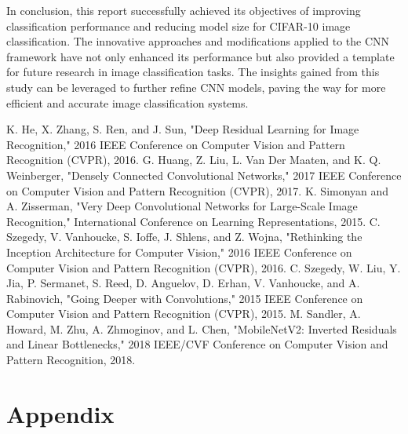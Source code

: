\documentclass[conference]{IEEEtran}
\begin{document}
	In conclusion, this report successfully achieved its objectives of improving classification performance and reducing model size for CIFAR-10 image classification. The innovative approaches and modifications applied to the CNN framework have not only enhanced its performance but also provided a template for future research in image classification tasks. The insights gained from this study can be leveraged to further refine CNN models, paving the way for more efficient and accurate image classification systems.
	
	\begin{thebibliography}{00}
		 K. He, X. Zhang, S. Ren, and J. Sun, "Deep Residual Learning for Image Recognition," 2016 IEEE Conference on Computer Vision and Pattern Recognition (CVPR), 2016.
		 G. Huang, Z. Liu, L. Van Der Maaten, and K. Q. Weinberger, "Densely Connected Convolutional Networks," 2017 IEEE Conference on Computer Vision and Pattern Recognition (CVPR), 2017.
		 K. Simonyan and A. Zisserman, "Very Deep Convolutional Networks for Large-Scale Image Recognition," International Conference on Learning Representations, 2015.
		 C. Szegedy, V. Vanhoucke, S. Ioffe, J. Shlens, and Z. Wojna, "Rethinking the Inception Architecture for Computer Vision," 2016 IEEE Conference on Computer Vision and Pattern Recognition (CVPR), 2016.
		 C. Szegedy, W. Liu, Y. Jia, P. Sermanet, S. Reed, D. Anguelov, D. Erhan, V. Vanhoucke, and A. Rabinovich, "Going Deeper with Convolutions," 2015 IEEE Conference on Computer Vision and Pattern Recognition (CVPR), 2015.
		 M. Sandler, A. Howard, M. Zhu, A. Zhmoginov, and L. Chen, "MobileNetV2: Inverted Residuals and Linear Bottlenecks," 2018 IEEE/CVF Conference on Computer Vision and Pattern Recognition, 2018.
	\end{thebibliography}
	
	\appendix
	\section{Appendix}
	
\end{document}
